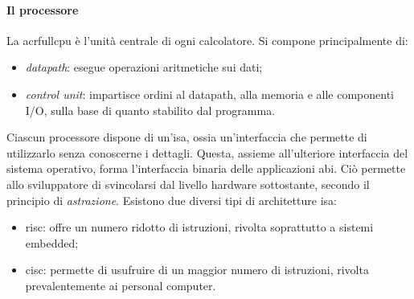 \documentclass[class=book, crop=false, oneside]{standalone}
\begin{document}
\paragraph*{Il processore}
La acrfull{cpu} è l'unità centrale di ogni calcolatore. Si compone principalmente di:
\begin{itemize}
	\item \emph{datapath}: esegue operazioni aritmetiche sui dati;
	\item \emph{control unit}: impartisce ordini al datapath, alla memoria e alle componenti I/O, sulla base di quanto stabilito dal programma.
\end{itemize}
Ciascun processore dispone di un'\acrfull{isa}, ossia un'interfaccia che permette di utilizzarlo senza conoscerne i dettagli.
Questa, assieme all'ulteriore interfaccia del sistema operativo, forma l'interfaccia binaria delle applicazioni \acrfull{abi}.
Ciò permette allo sviluppatore di svincolarsi dal livello hardware sottostante, secondo il principio di \emph{astrazione}. Esistono due diversi tipi di architetture \acrshort{isa}:
\begin{itemize}
	\item \acrshort{risc}: offre un numero ridotto di istruzioni, rivolta soprattutto a sistemi embedded;
	\item \acrshort{cisc}: permette di usufruire di un maggior numero di istruzioni, rivolta prevalentemente ai personal computer.
\end{itemize}
\end{document}
